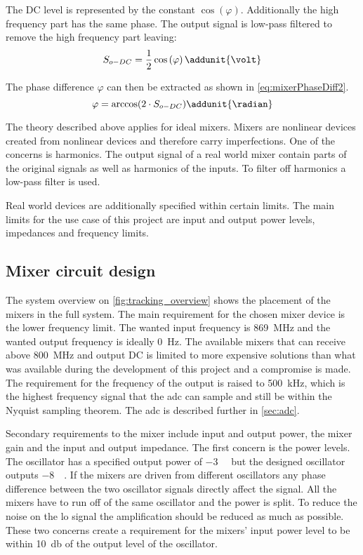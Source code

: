 The DC level is represented by the constant $\cos \left( \varphi  \right)$. Additionally the high frequency part has the same phase. The output signal is low-pass filtered to remove the high frequency part leaving:
\begin{equation} \label{eq:mixerPhaseDiff1}
	S_{o-DC} = \frac{1}{2}  \cos \left( \varphi  \right) \addunit{\volt}
\end{equation}

The phase difference $\varphi$ can then be extracted as shown in \autoref{eq:mixerPhaseDiff2}.
\begin{equation}
	\varphi = \arccos(2 \cdot S_{o-DC}) \addunit{\radian} \label{eq:mixerPhaseDiff2}
\end{equation}

The theory described above applies for ideal mixers. Mixers are nonlinear devices created from nonlinear devices and therefore carry imperfections. One of the concerns is harmonics. The output signal of a real world mixer contain parts of the original signals as well as harmonics of the inputs. To filter off harmonics a low-pass filter is used.

Real world devices are additionally specified within certain limits. The main limits for the use case of this project are input and output power levels, impedances and frequency limits.

\subsection{Mixer circuit design} \label{sec:mixercircuitdesign}
The system overview on \autoref{fig:tracking_overview} shows the placement of the mixers in the full system. The main requirement for the chosen mixer device is the lower frequency limit. The wanted input frequency is \SI{869}{\mega\hertz} and the wanted output frequency is ideally \SI{0}{\hertz}. The available mixers that can receive above \SI{800}{\mega\hertz} and output DC is limited to more expensive solutions than what was available during the development of this project and a compromise is made. The requirement for the frequency of the output is raised to \SI{500}{\kilo\hertz}, which is the highest frequency signal that the \gls{adc} can sample and still be within the Nyquist sampling theorem. The \gls{adc} is described further in \autoref{sec:adc}.

Secondary requirements to the mixer include input and output power, the mixer gain and the input and output impedance. 
The first concern is the power levels. The oscillator has a specified output power of \SI{-3}{\deci\belm} \citep{datasheet:MAX2622} but the designed oscillator outputs \SI{-8}{\deci\belm}. If the mixers are driven from different oscillators any phase difference between the two oscillator signals directly affect the signal. All the mixers have to run off of the same oscillator and the power is split. To reduce the noise on the \gls{lo} signal the amplification should be reduced as much as possible. These two concerns create a requirement for the mixers' input power level to be within \SI{10}{\decibel} of the output level of the oscillator.

